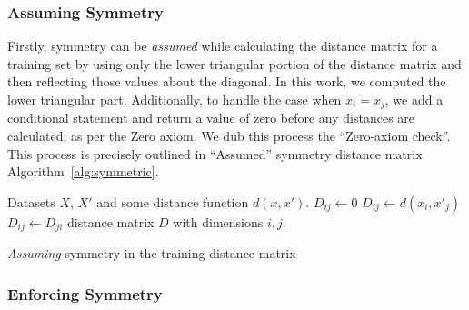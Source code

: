 \documentclass[preprint,12pt]{article}
\begin{document}
\subsubsection{Assuming Symmetry}

Firstly, symmetry can be \textit{assumed} while calculating the distance matrix for a training set by using only the lower triangular portion of the distance matrix and then reflecting those values about the diagonal.
In this work, we computed the lower triangular part.
Additionally, to handle the case when $x_i = x_j$, we add a conditional statement and return a value of zero before any distances are calculated, as per the Zero axiom. 
We dub this process the ``Zero-axiom check''.
This process is precisely outlined in ``Assumed'' symmetry distance matrix Algorithm~\ref{alg:symmetric}.

\begin{algorithm}
    \begin{algorithmic}
        \Require Datasets $X$, $X'$ and some distance function $d(x, x')$.
             
                 
                    \State $D_{ij} \gets 0$
                \Else
                    \State $D_{ij} \gets d(x_{i},x'_{j})$
                \EndIf
                \State $D_{ij} \gets D_{ji}$ 
            \EndFor
        \EndFor
        \State \Return distance matrix $D$ with dimensions $i,j$.
    \end{algorithmic}
    \caption{\textit{Assuming} symmetry in the training distance matrix}
    \label{alg:symmetric}
\end{algorithm}



\subsubsection{Enforcing Symmetry}
\end{document}

